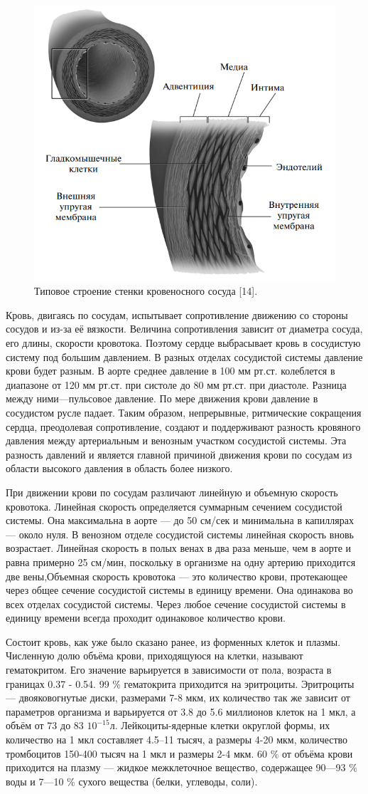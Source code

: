 \documentclass[a4paper, 14pt]{article}
\begin{document}
\begin{figure}[h]
\centering
\includegraphics[width=0.3\linewidth]{stenki.png}
\caption{ Типовое строение стенки кровеносного сосуда [14].}
\label{fig:mpr}
\end{figure}

Кровь, двигаясь по сосудам, испытывает сопротивление движению со стороны сосудов и из-за её вязкости. Величина сопротивления зависит от диаметра сосуда, его длины, скорости кровотока. Поэтому сердце выбрасывает кровь в сосудистую систему под большим давлением. В разных отделах сосудистой системы давление крови будет разным. В аорте среднее давление в 100 мм рт.ст. колеблется в диапазоне от 120 мм рт.ст. при систоле до 80 мм рт.ст. при диастоле. Разница между ними—пульсовое давление. По мере движения крови давление в сосудистом русле падает. Таким образом, непрерывные, ритмические сокращения сердца, преодолевая сопротивление, создают и поддерживают разность кровяного давления между артериальным и венозным участком сосудистой системы. Эта разность давлений и является главной причиной движения крови по сосудам из области высокого давления в область более низкого.

При движении крови по сосудам различают линейную и объемную скорость кровотока. Линейная скорость определяется суммарным сечением сосудистой системы. Она максимальна в аорте — до 50 см/сек и минимальна в капиллярах — около нуля. В венозном отделе сосудистой системы линейная скорость вновь возрастает. Линейная скорость в полых венах в два раза меньше, чем в аорте и равна примерно 25 см/мин, поскольку в организме на одну артерию приходится две вены,Объемная скорость кровотока — это количество крови, протекающее через общее сечение сосудистой системы в единицу времени. Она одинакова во всех отделах сосудистой системы. Через любое сечение сосудистой системы в единицу времени всегда проходит одинаковое количество крови.

Состоит кровь, как уже было сказано ранее, из форменных клеток и плазмы. Численную долю объёма крови, приходящуюся на клетки, называют гематокритом. Его значение варьируется в зависимости от пола, возраста в границах 0.37 - 0.54. 99 \% гематокрита приходится на эритроциты. Эритроциты— двояковогнутые диски, размерами 7-8 мкм, их количество так же зависит от параметров организма и варьируется от 3.8 до 5.6 миллионов клеток на 1 мкл, а объём от 73 до 83 $10^{-15}$л. Лейкоциты-ядерные клетки округлой формы, их количество на 1 мкл составляет 4.5–11 тысяч, а размеры 4-20 мкм, количество тромбоцитов 150-400 тысяч на 1 мкл и размеры 2-4 мкм. 60 \% от объёма крови приходится на плазму — жидкое межклеточное вещество, содержащее 90—93 \% воды и 7—10 \% сухого вещества (белки, углеводы, соли).
\end{document}
